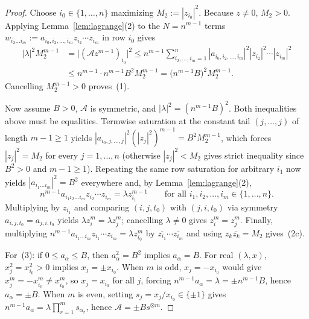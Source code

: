 \documentclass[11pt]{article}
\theoremstyle{definition}
\newcommand{\cA}{\mathcal{A}}
\begin{document}
\begin{proof}
Choose $i_0 \in \{1, \dots, n\}$ maximizing $M_2 := |z_{i_0}|^2$. Because $z \ne 0$, $M_2 > 0$.
Applying Lemma~\ref{lem:lagrange}(2) to the $N = n^{m-1}$ terms
$w_{i_2 \dots i_m} := a_{i_0, i_2, \dots, i_m} z_{i_2} \cdots z_{i_m}$ in row $i_0$ gives
\begin{align*}
  |\lambda|^2 M_2^{m-1}
  &= \bigl|(\cA z^{m-1})_{i_0}\bigr|^2
   \le n^{m-1} \sum_{i_2, \dots, i_m = 1}^n |a_{i_0, i_2, \dots, i_m}|^2 |z_{i_2}|^2 \cdots |z_{i_m}|^2 \\
  &\le n^{m-1} \cdot n^{m-1} B^2 M_2^{m-1} = \bigl(n^{m-1} B\bigr)^2 M_2^{m-1}.
\end{align*}
Cancelling $M_2^{m-1} > 0$ proves~(1).

Now assume $B > 0$, $\cA$ is symmetric, and $|\lambda|^2 = (n^{m-1} B)^2$. Both inequalities
above must be equalities. Termwise saturation at the constant tail $(j, \dots, j)$ of length
$m - 1 \ge 1$ yields $|a_{i_0, j, \dots, j}|^2 (|z_j|^2)^{m-1} = B^2 M_2^{m-1}$, which forces
$|z_j|^2 = M_2$ for every $j = 1, \dots, n$ (otherwise $|z_j|^2 < M_2$ gives strict inequality
since $B^2 > 0$ and $m - 1 \ge 1$). Repeating the same row saturation for arbitrary $i_1$ now
yields $|a_{i_1 \dots i_m}|^2 = B^2$ everywhere and, by Lemma~\ref{lem:lagrange}(2),
\[
  n^{m-1} a_{i_1 i_2 \dots i_m} z_{i_2} \cdots z_{i_m} = \lambda z_{i_1}^{m-1}
  \qquad \text{for all } i_1, i_2, \dots, i_m \in \{1, \dots, n\}.
\]
Multiplying by $z_{i_1}$ and comparing $(i, j, t_0)$ with $(j, i, t_0)$ via symmetry
$a_{i, j, t_0} = a_{j, i, t_0}$ yields $\lambda z_i^m = \lambda z_j^m$; cancelling $\lambda \ne 0$
gives $z_i^m = z_j^m$. Finally, multiplying $n^{m-1} a_{i_1 \dots i_m} z_{i_1} \cdots z_{i_m} =
\lambda z_{i_0}^m$ by $\overline{z_{i_1}} \cdots \overline{z_{i_m}}$ and using
$z_k \overline{z_k} = M_2$ gives~(2c).

For~(3): if $0 \le a_\alpha \le B$, then $a_\alpha^2 = B^2$ implies $a_\alpha = B$. For real
$(\lambda, x)$, $x_j^2 = x_{i_0}^2 > 0$ implies $x_j = \pm x_{i_0}$. When $m$ is odd,
$x_j = -x_{i_0}$ would give $x_j^m = -x_{i_0}^m \ne x_{i_0}^m$, so $x_j = x_{i_0}$ for all $j$,
forcing $n^{m-1} a_\alpha = \lambda = \pm n^{m-1} B$, hence $a_\alpha = \pm B$. When $m$ is even,
setting $s_j = x_j / x_{i_0} \in \{\pm 1\}$ gives $n^{m-1} a_\alpha = \lambda \prod_{r=1}^m s_{\alpha_r}$,
hence $\cA = \pm B s^{\otimes m}$.
\end{proof}
\end{document}
